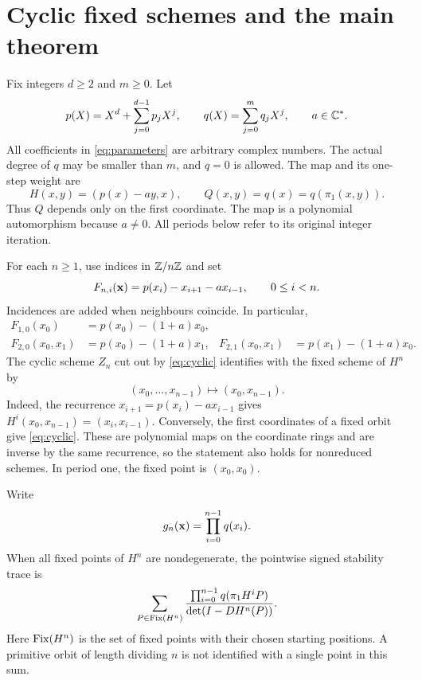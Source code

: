\section{Cyclic fixed schemes and the main theorem}\label{sec:setup}

Fix integers $d\ge2$ and $m\ge0$. Let
\begin{equation}\label{eq:parameters}
 p(X)=X^d+\sum_{j=0}^{d-1}p_jX^j,
 \qquad q(X)=\sum_{j=0}^{m}q_jX^j,
 \qquad a\in\mathbb C^*.
\end{equation}
All coefficients in \eqref{eq:parameters} are arbitrary complex numbers.
The actual degree of $q$ may be smaller than $m$, and $q=0$ is allowed.
The map and its one-step weight are
\begin{equation}\label{eq:map}
 H(x,y)=(p(x)-ay,x),\qquad Q(x,y)=q(x)=q(\pi_1(x,y)).
\end{equation}
Thus $Q$ depends only on the first coordinate. The map is a polynomial
automorphism because $a\ne0$. All periods below refer to its original
integer iteration.

For each $n\ge1$, use indices in $\mathbb Z/n\mathbb Z$ and set
\begin{equation}\label{eq:cyclic}
 F_{n,i}(\mathbf x)=p(x_i)-x_{i+1}-a x_{i-1},
 \qquad 0\le i<n.
\end{equation}
Incidences are added when neighbours coincide. In particular,
\begin{align}
 F_{1,0}(x_0)&=p(x_0)-(1+a)x_0,\label{eq:period-one}\\
 F_{2,0}(x_0,x_1)&=p(x_0)-(1+a)x_1,
 &F_{2,1}(x_0,x_1)&=p(x_1)-(1+a)x_0.\label{eq:period-two}
\end{align}
The cyclic scheme $Z_n$ cut out by \eqref{eq:cyclic} identifies with the
fixed scheme of $H^n$ by
\begin{equation}\label{eq:scheme-correspondence}
 (x_0,\ldots,x_{n-1})\longmapsto (x_0,x_{n-1}).
\end{equation}
Indeed, the recurrence $x_{i+1}=p(x_i)-a x_{i-1}$ gives
$H^i(x_0,x_{n-1})=(x_i,x_{i-1})$. Conversely, the first coordinates of a
fixed orbit give \eqref{eq:cyclic}. These are polynomial maps on the
coordinate rings and are inverse by the same recurrence, so the statement
also holds for nonreduced schemes. In period one, the fixed point is
$(x_0,x_0)$.

Write
\begin{equation}\label{eq:numerator}
 g_n(\mathbf x)=\prod_{i=0}^{n-1}q(x_i).
\end{equation}
When all fixed points of $H^n$ are nondegenerate, the pointwise signed
stability trace is
\begin{equation}\label{eq:pointwise-trace}
 \sum_{P\in\operatorname{Fix}(H^n)}
 \frac{\prod_{i=0}^{n-1}q(\pi_1H^iP)}{\det(I-DH^n(P))}.
\end{equation}
Here $\operatorname{Fix}(H^n)$ is the set of fixed points with their chosen starting
positions. A primitive orbit of length dividing $n$ is not identified
with a single point in this sum.

